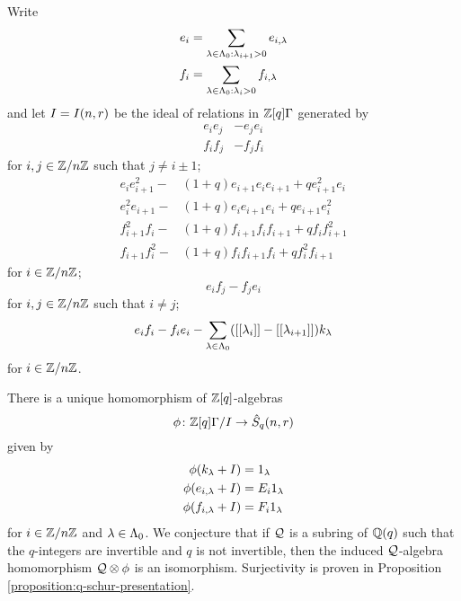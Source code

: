 \documentclass[a4paper, 11pt, twoside]{report}
\begin{document}
Write
\begin{align*}
e_i &= \sum_{\lambda\in\Lambda_0{}:\lambda_{i+1}>0} e_{i,\lambda}\\
f_i &= \sum_{\lambda\in\Lambda_0{}:\lambda_i>0} f_{i,\lambda}
\end{align*}
and let $I=I(n,r)$ be the ideal of relations in $\mathbb{Z}[q]\Gamma$ generated by
\begin{align*}
e_ie_j &-e_je_i\\
f_if_j &-f_jf_i
\end{align*}
for $i,j\in\mathbb{Z}/{n \mathbb{Z}}$ such that $j\neq i\pm 1$;
\begin{align*}
e_ie_{i+1}^2 -&(1+q)e_{i+1}e_ie_{i+1} +qe_{i+1}^2e_i\\
e_i^2e_{i+1} -&(1+q)e_ie_{i+1}e_i +qe_{i+1}e_i^2\\
f_{i+1}^2f_i -&(1+q)f_{i+1}f_if_{i+1} +qf_if_{i+1}^2\\
f_{i+1}f_i^2 -&(1+q)f_if_{i+1}f_i +qf_i^2f_{i+1}
\end{align*}
for $i\in\mathbb{Z}/{n \mathbb{Z}}$;
\begin{equation*}
e_if_j-f_je_i
\end{equation*}
for $i,j\in\mathbb{Z}/{n \mathbb{Z}}$ such that $i\neq j$;
\begin{equation*}
e_if_i-f_ie_i - \sum_{\lambda\in\Lambda_0{}}([[\lambda_i]]-[[\lambda_{i+1}]])k_\lambda
\end{equation*}
for $i\in\mathbb{Z}/{n \mathbb{Z}}$.

There is a unique homomorphism of $\mathbb{Z}[q]$-algebras
\begin{equation*}
\phi\colon\mathbb{Z}[q]\Gamma/{I}\to\hat{S}_q(n,r)
\end{equation*}
given by
\begin{align*}
\phi(k_\lambda + I) &= 1_\lambda\\
\phi(e_{i,\lambda} + I) &= E_i1_\lambda\\
\phi(f_{i,\lambda} + I) &= F_i1_\lambda
\end{align*}
for $i\in\mathbb{Z}/{n \mathbb{Z}}$ and $\lambda\in\Lambda_0{}$. We conjecture that if $\mathcal{Q}$ is a subring of $\mathbb{Q}(q)$ such that the $q$-integers are invertible and $q$ is not invertible, then the induced $\mathcal{Q}$-algebra homomorphism $\mathcal{Q}\otimes\phi$ is an isomorphism. Surjectivity is proven in Proposition \ref{proposition:q-schur-presentation}.
\end{document}
